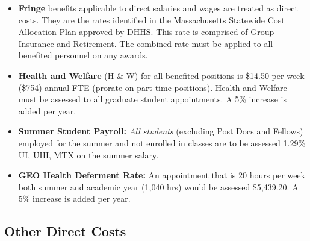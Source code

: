 \begin{itemize}

\item \textbf{Fringe} benefits applicable to direct salaries and wages
  are treated as direct costs. They are the rates identified in the
  Massachusetts Statewide Cost Allocation Plan approved by DHHS. This
  rate is comprised of Group Insurance and Retirement. The combined
  rate must be applied to all benefited personnel on any awards.

\item \textbf{Health and Welfare} (H \& W) for all benefited positions
  is \$14.50 per week (\$754) annual FTE (prorate on part-time
  positions).  Health and Welfare must be assessed to all graduate
  student appointments.  A 5\% increase is added per year.

\item \textbf{Summer Student Payroll:} \emph{All students} (excluding
  Post Docs and Fellows) employed for the summer and not enrolled in
  classes are to be assessed 1.29\% UI, UHI, MTX on the summer salary.

\item \textbf{GEO Health Deferment Rate:} An appointment that is 20
  hours per week both summer and academic year (1,040 hrs) would be
  assessed \$5,439.20.  A 5\% increase is added per year.

\end{itemize}

\subsection*{Other Direct Costs}

